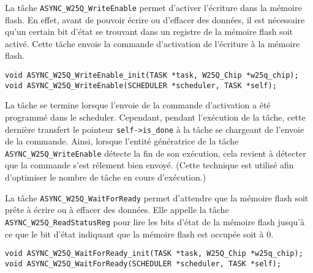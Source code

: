 

La tâche \texttt{ASYNC\_W25Q\_WriteEnable} permet d'activer l'écriture dans la
mémoire flash. En effet, avant de pouvoir écrire ou d'effacer des données, il est
nécessaire qu'un certain bit d'état se trouvant dans un registre de la mémoire flash
soit activé. Cette tâche envoie la commande d'activation de l'écriture à la mémoire
flash.

\begin{lstlisting}[style=prog, frame=shadowbox, label={lst:ASYNC_W25Q_WriteEnable},
    emph={[1]ASYNC_W25Q_WriteEnable_init, ASYNC_W25Q_WriteEnable}, emphstyle={[1]\color{C}},
    emph={[2]W25Q_Chip, SCHEDULER, TASK}, emphstyle={[2]\color{E}}]
void ASYNC_W25Q_WriteEnable_init(TASK *task, W25Q_Chip *w25q_chip);
void ASYNC_W25Q_WriteEnable(SCHEDULER *scheduler, TASK *self);
\end{lstlisting}

La tâche se termine lorsque l'envoie de la commande d'activation a été programmé
dans le scheduler. Cependant, pendant l'exécution de la tâche, cette dernière
transfert le pointeur \texttt{self->is\_done} à la tâche se chargeant de l'envoie de
la commande. Ainsi, lorsque l'entité génératrice de la tâche
\texttt{ASYNC\_W25Q\_WriteEnable} détecte la fin de son exécution, cela revient à
détecter que la commande s'est rélement bien envoyé. (Cette technique est utilisé 
afin d'optimiser le nombre de tâche en cours d'exécution.) 



La tâche \texttt{ASYNC\_W25Q\_WaitForReady} permet d'attendre que la mémoire flash
soit prête à écrire ou à effacer des données. Elle appelle la tâche
\texttt{ASYNC\_W25Q\_ReadStatusReg} pour lire les bits d'état de la mémoire flash
jusqu'à ce que le bit d'état indiquant que la mémoire flash est occupée soit à 0.

\begin{lstlisting}[style=prog, frame=shadowbox, label={lst:ASYNC_W25Q_WaitForReady},
    emph={[1]ASYNC_W25Q_WaitForReady_init, ASYNC_W25Q_WaitForReady}, emphstyle={[1]\color{C}},
    emph={[2]W25Q_Chip, SCHEDULER, TASK}, emphstyle={[2]\color{E}}]
void ASYNC_W25Q_WaitForReady_init(TASK *task, W25Q_Chip *w25q_chip);
void ASYNC_W25Q_WaitForReady(SCHEDULER *scheduler, TASK *self);
\end{lstlisting}


